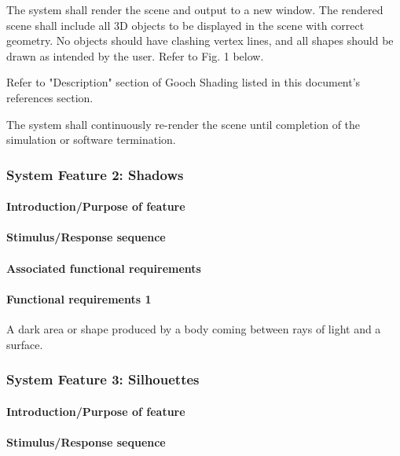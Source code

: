 \documentclass[10pt,journal,compsoc]{IEEEtran}
\begin{document}
\begin{flushleft}
\vspace{3mm}
The system shall render the scene and output to a new window.
The rendered scene shall include all 3D objects to be displayed in the scene with correct geometry.
No objects should have clashing vertex lines, and all shapes should be drawn as intended by the user.
Refer to Fig. 1 below.

\vspace{3mm}
Refer to "Description" section of Gooch Shading listed in this document's references section.

\vspace{3mm}
The system shall continuously re-render the scene until completion of the simulation or software termination.


\subsubsection{System Feature 2: Shadows}

\paragraph{Introduction/Purpose of feature}

\paragraph{Stimulus/Response sequence}

\paragraph{Associated functional requirements}

\paragraph{Functional requirements 1}
A dark area or shape produced by a body coming between rays of light and a surface.


\subsubsection{System Feature 3: Silhouettes}

\paragraph{Introduction/Purpose of feature}

\paragraph{Stimulus/Response sequence}


\end{flushleft}
\end{document}
